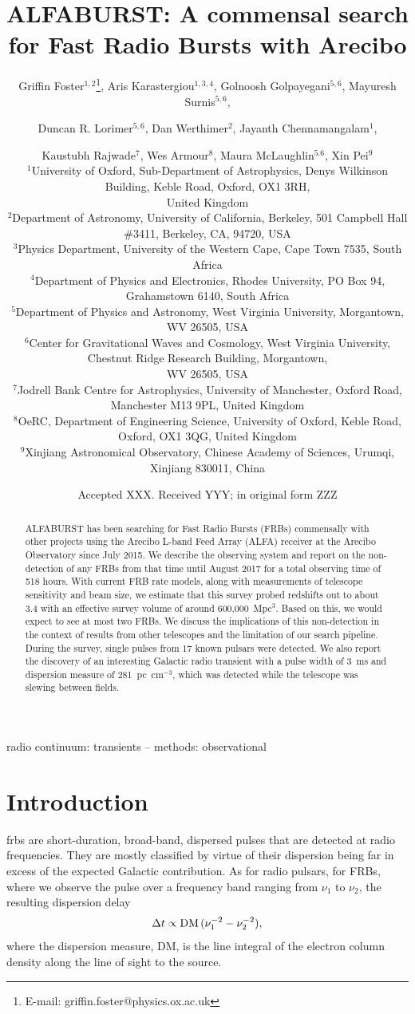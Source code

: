 \documentclass[a4paper,fleqn,usenatbib]{mnras}
\title[The ALFABURST Commensal FRB Survey]{ALFABURST: A commensal search for
Fast Radio Bursts with Arecibo}
\author[G. Foster et al.]{Griffin Foster$^{1,2}$\thanks{E-mail: griffin.foster@physics.ox.ac.uk},
Aris Karastergiou$^{1,3,4}$,
Golnoosh Golpayegani$^{5,6}$,
Mayuresh Surnis$^{5,6}$, 
\and Duncan R. Lorimer$^{5,6}$,
Dan Werthimer$^{2}$,
Jayanth Chennamangalam$^{1}$,
\and Kaustubh Rajwade$^{7}$,
Wes Armour$^{8}$,
Maura McLaughlin$^{5.6}$,
Xin Pei$^{9}$
\\
$^{1}$University of Oxford, Sub-Department of Astrophysics, Denys Wilkinson Building, Keble Road, Oxford, OX1 3RH,\\United Kingdom\\
$^{2}$Department of Astronomy, University of California, Berkeley, 501 Campbell Hall \#3411, Berkeley, CA, 94720, USA\\
$^{3}$Physics Department, University of the Western Cape, Cape Town 7535, South Africa\\
$^{4}$Department of Physics and Electronics, Rhodes University, PO Box 94, Grahamstown 6140, South Africa\\
$^{5}$Department of Physics and Astronomy, West Virginia University, Morgantown, WV 26505, USA\\
$^{6}$Center for Gravitational Waves and Cosmology, West Virginia University, Chestnut Ridge Research Building, Morgantown,\\ WV 26505, USA\\
$^{7}$Jodrell Bank Centre for Astrophysics, University of Manchester, Oxford Road, Manchester M13 9PL, United Kingdom\\ 
$^{8}$OeRC, Department of Engineering Science, University of Oxford, Keble Road, Oxford, OX1 3QG, United Kingdom\\
$^{9}$Xinjiang Astronomical Observatory, Chinese Academy of Sciences, Urumqi, Xinjiang 830011, China\\
}
\date{Accepted XXX. Received YYY; in original form ZZZ}
\begin{document}
\label{firstpage}
\pagerange{\pageref{firstpage}--\pageref{lastpage}}
\maketitle

\begin{abstract}
ALFABURST has been searching for Fast Radio Bursts (FRBs) commensally with
other projects using the Arecibo L-band Feed Array (ALFA) receiver at the
Arecibo Observatory since July 2015. We describe the observing system and
report on the non-detection of any FRBs from that time until August 2017 for a
total observing time of 518 hours.  With current FRB rate models, along with
measurements of telescope sensitivity and beam size, we estimate that this
survey probed redshifts out to about 3.4 with an effective survey volume of
around 600,000~Mpc$^3$. Based on this, we would expect to see at most two FRBs.
We discuss the implications of this non-detection in the context of results
from other telescopes and the limitation of our search pipeline.  During the
survey, single pulses from 17 known pulsars were detected.  We also report the
discovery of an interesting Galactic radio transient with a pulse width of 3~ms
and dispersion measure of 281~pc~cm$^{-3}$, which was detected while the
telescope was slewing between fields.
\end{abstract}

\begin{keywords}
radio continuum: transients -- methods: observational
\end{keywords}


\section{Introduction}
\label{sec:intro}

\glspl{frb} are short-duration, broad-band, dispersed pulses that are detected
at radio frequencies. They are mostly classified by virtue of their dispersion
being far in excess of the expected Galactic contribution. As for radio pulsars,
for FRBs, where we observe the pulse over a frequency band ranging from $\nu_1$
to $\nu_2$, the resulting dispersion delay 
%
\begin{equation}
\Delta t \propto {\rm DM} \, (\nu_1^{-2} - \nu_2^{-2}),
\end{equation}
%
where the dispersion measure, DM, is the line integral of the electron column
density along the line of sight to the source.
\end{document}
